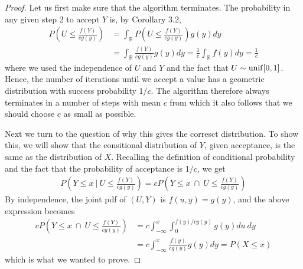 \begin{proof}
  Let us first make sure that the algorithm terminates. The probability in any given step 2 to accept $Y$ is, by Corollary 3.2,
  \begin{align*}
    P\left( U \leq \frac{f(Y)}{cg(y)} \right) &=
    \int_{\mathbb{R}} P\left( U \leq \frac{f(Y)}{cg(y)} \right) g(y)dy \\
    &= \int_{\mathbb{R}} \frac{f(Y)}{cg(y)} g(y)dy =
    \frac{1}{c}\int_\mathbb{R}f(y)dy =
    \frac{1}{c}
  \end{align*}
  where we used the independence of $U$ and $Y$ and the fact that $U \sim \operatorname{unif}[0,1]$. Hence, the number of iterations until we accept a value has a geometric distribution with success probability $1/c$. The algorithm therefore always terminates in a number of steps with mean $c$ from which it also follows that we should choose $c$ as small as possible.

  Next we turn to the question of why this gives the corresct distribution. To show this, we will show that the consitional distribution of $Y$, given acceptance, is the same as the distribution of $X$. Recalling the definition of conditional probability and the fact that the probability of acceptance is $1/c$, we get
  \begin{align*}
    P\left(Y \leq x \ \bigg| \ U \leq \frac{f(Y)}{cg(y)} \right) =
    cP\left(Y \leq x \ \cap \ U \leq \frac{f(Y)}{cg(y)}\right)
  \end{align*}
  By independence, the joint pdf of $(U, Y)$ is $f(u,y) = g(y)$, and the above expression becomes
  \begin{align*}
    cP\left(Y \leq x \ \cap \ U \leq \frac{f(Y)}{cg(y)}\right) &= c \int_{-\infty}^x \int_0^{f(y)/cg(y)} g(y)du \ dy \\
    &= c \int_{-\infty}^x \frac{f(y)}{cg(y)}g(y)dy = P(X \leq x)
  \end{align*}
  which is what we wanted to prove.
\end{proof}
